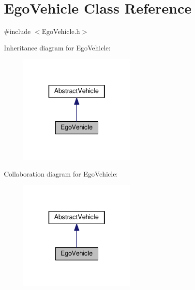 \hypertarget{classEgoVehicle}{}\section{Ego\+Vehicle Class Reference}
\label{classEgoVehicle}


{\ttfamily \#include $<$Ego\+Vehicle.\+h$>$}



Inheritance diagram for Ego\+Vehicle\+:\nopagebreak
\begin{figure}[H]
\begin{center}
\leavevmode
\includegraphics[width=166pt]{classEgoVehicle__inherit__graph}
\end{center}
\end{figure}


Collaboration diagram for Ego\+Vehicle\+:\nopagebreak
\begin{figure}[H]
\begin{center}
\leavevmode
\includegraphics[width=166pt]{classEgoVehicle__coll__graph}
\end{center}
\end{figure}
